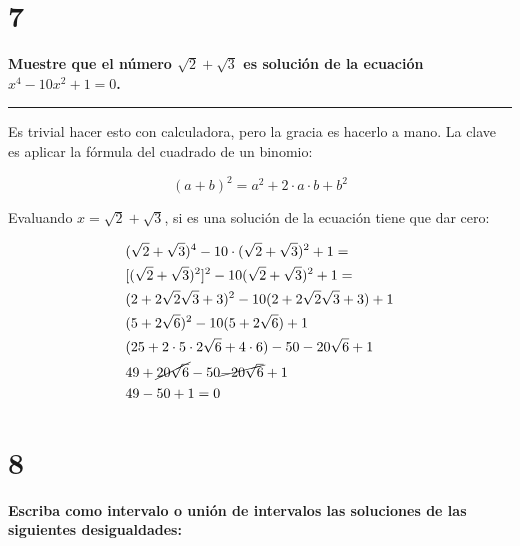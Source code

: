 \documentclass{article}
\begin{document}
\section*{7}
\label{sec:7}

\textbf{Muestre que el número $\sqrt{2} + \sqrt{3}$ es solución de la ecuación \\ $  x^4 - 10 x^2 + 1 = 0$.}
\vspace{0.5em}
\hrule
\vspace{1em}
Es trivial hacer esto con calculadora, pero la gracia es hacerlo a mano. La clave es aplicar la fórmula del cuadrado de un binomio:

\begin{equation}
(a + b)^2 = a^2 + 2 \cdot a \cdot b + b^2
\end{equation}

Evaluando $x = \sqrt{2} + \sqrt{3}$, si es una solución de la ecuación tiene que dar cero:

\begin{subequations}
\begin{align}
& (\sqrt{2} + \sqrt{3})^4 - 10 \cdot (\sqrt{2} + \sqrt{3})^2 + 1 = \\
& [(\sqrt{2} + \sqrt{3})^2]^2 - 10 (\sqrt{2} + \sqrt{3})^2 + 1 = \\
& (2 + 2 \sqrt{2} \sqrt{3} + 3)^2 - 10 (2 + 2 \sqrt{2} \sqrt{3} + 3) + 1 \\
& (5 + 2 \sqrt{6})^2 - 10 (5 + 2 \sqrt{6}) + 1 \\
& (25 + 2 \cdot 5 \cdot 2 \sqrt{6} + 4 \cdot 6) - 50 -20 \sqrt{6} + 1 \\
& 49 + \cancel{20 \sqrt{6}} - 50 \cancel{-20 \sqrt{6}} + 1 \\
& 49 -50 + 1 = 0
\end{align}
\end{subequations}

\section*{8}
\label{sec:8}

\textbf{Escriba como intervalo o unión de intervalos las soluciones de las siguientes desigualdades:}
\end{document}
